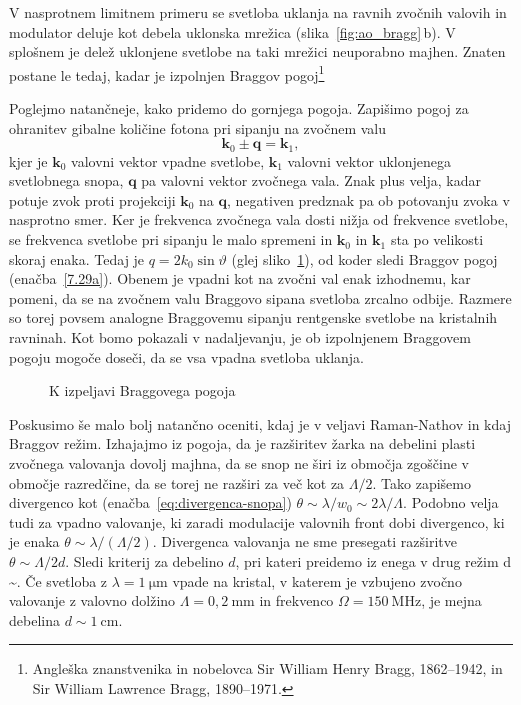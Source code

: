 V nasprotnem limitnem primeru se svetloba uklanja na ravnih zvočnih valovih in modulator deluje 
kot debela uklonska mrežica (slika~\ref{fig:ao_bragg}\,b). 
V splošnem je delež uklonjene svetlobe na taki mrežici neuporabno majhen. 
Znaten postane le tedaj, kadar je izpolnjen Braggov
pogoj\footnote{Angleška znanstvenika in nobelovca Sir William Henry Bragg, 1862--1942,
in Sir William Lawrence Bragg, 1890--1971.}

Poglejmo natančneje, kako pridemo do gornjega pogoja. Zapišimo pogoj
za ohranitev gibalne količine fotona pri sipanju na zvočnem valu
\begin{equation}
\mathbf{k}_{0}\pm\mathbf{q}=\mathbf{k}_{1},
\label{7.30}
\end{equation}
kjer je $\mathbf{k}_{0}$ valovni vektor vpadne svetlobe, $\mathbf{k}_{1}$
valovni vektor uklonjenega svetlobnega snopa, $\mathbf{q}$ pa valovni
vektor zvočnega vala. Znak plus velja, kadar potuje zvok proti projekciji
$\mathbf{k}_{0}$ na $\mathbf{q}$, negativen predznak pa ob potovanju zvoka v nasprotno smer. 
Ker je frekvenca zvočnega vala dosti nižja od frekvence svetlobe, se frekvenca svetlobe 
pri sipanju le malo spremeni in $\mathbf{k}_{0}$ in $\mathbf{k}_{1}$ sta po velikosti skoraj enaka.
Tedaj je $q=2k_{0}\sin\vartheta$ (glej sliko~\ref{fig:ao_bragg3}), od koder sledi Braggov pogoj 
(enačba~\ref{7.29a}). Obenem je vpadni kot na zvočni val enak izhodnemu, kar pomeni, da se na
zvočnem valu Braggovo sipana svetloba zrcalno odbije. Razmere so torej
povsem analogne Braggovemu sipanju rentgenske svetlobe na kristalnih
ravninah. Kot bomo pokazali v nadaljevanju, je ob izpolnjenem Braggovem pogoju mogoče doseči, 
da se vsa vpadna svetloba uklanja.
\begin{figure}[h]
\centering
\def\svgwidth{40truemm} 

\caption{K izpeljavi Braggovega pogoja}
\label{fig:ao_bragg3}
\end{figure}
\begin{remark}
 Poskusimo še malo bolj natančno oceniti, kdaj je v veljavi Raman-Nathov in kdaj Braggov režim. 
Izhajajmo iz pogoja, da je razširitev žarka na debelini plasti zvočnega valovanja dovolj
 majhna, da se snop ne širi iz območja zgoščine v območje razredčine, da se torej ne razširi za 
 več kot za $\Lambda/2$. Tako zapišemo
 divergenco kot (enačba~\ref{eq:divergenca-snopa}) $\theta \sim \lambda/w_0 \sim 2\lambda/\Lambda$.
 Podobno velja tudi za vpadno valovanje, ki zaradi modulacije valovnih front dobi divergenco, 
 ki je enaka $\theta \sim \lambda/(\Lambda/2).$ Divergenca valovanja ne sme presegati 
 razširitve $\theta \sim \Lambda/2d$.
  Sledi kriterij za debelino $d$, pri kateri preidemo iz enega v drug režim
\beq
d \sim {}.
\eeq
Če svetloba z $\lambda = 1~\si{\micro\metre}$ vpade na kristal, v katerem je vzbujeno zvočno
valovanje z valovno dolžino $\Lambda = 0,2~\si{\milli\metre}$ in frekvenco $\Omega = 150~\si{\mega\hertz}$, 
je mejna debelina $d \sim 1~\si{\centi\meter}$.
\end{remark}

